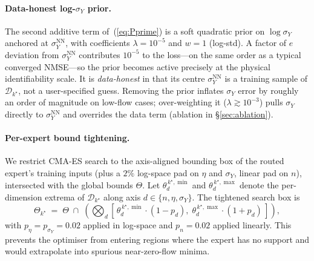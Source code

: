 \paragraph{Data-honest log-$\sigma_Y$ prior.}
The second additive term of~(\ref{eq:Pprime}) is a soft quadratic
prior on $\log\sigma_Y$ anchored at $\sigma_Y^{\mathrm{NN}}$, with
coefficients $\lambda = 10^{-5}$ and $w = 1$ (log-std). A factor of
$e$ deviation from $\sigma_Y^{\mathrm{NN}}$ contributes $10^{-5}$ to
the loss---on the same order as a typical converged NMSE---so the
prior becomes active precisely at the physical identifiability scale.
It is \emph{data-honest} in that its centre $\sigma_Y^{\mathrm{NN}}$
is a training sample of $\mathcal{D}_{k^{\star}}$, not a
user-specified guess. Removing the prior inflates $\sigma_Y$ error by
roughly an order of magnitude on low-flow cases; over-weighting it
($\lambda \gtrsim 10^{-3}$) pulls $\sigma_Y$ directly to
$\sigma_Y^{\mathrm{NN}}$ and overrides the data term
(ablation in \S\ref{sec:ablation}).

\paragraph{Per-expert bound tightening.}
We restrict CMA-ES search to the axis-aligned bounding box of the
routed expert's training inputs (plus a $2\%$ log-space pad on
$\eta$ and $\sigma_Y$, linear pad on $n$), intersected with the
global bounds $\Theta$. Let $\theta_d^{\,k^{\star},\min}$ and
$\theta_d^{\,k^{\star},\max}$ denote the per-dimension extrema of
$\mathcal{D}_{k^{\star}}$ along axis $d \in \{n, \eta, \sigma_Y\}$.
The tightened search box is
\begin{equation}
\label{eq:tight-box}
    \Theta_{k^{\star}}
    \;=\;
    \Theta
    \;\cap\;
    \left(
    \bigotimes_{d}\!\left[\,
      \theta_d^{\,k^{\star},\min}\!\cdot(1 - p_d),\;
      \theta_d^{\,k^{\star},\max}\!\cdot(1 + p_d)
    \,\right]\right),
\end{equation}
with $p_{\eta} = p_{\sigma_Y} = 0.02$ applied in log-space and
$p_{n} = 0.02$ applied linearly. This prevents the optimiser from
entering regions where the expert has no support and would
extrapolate into spurious near-zero-flow minima.

